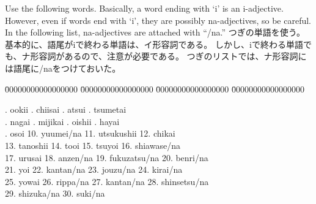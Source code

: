 \documentclass[uplatex,dvipdfmx,b5paper,english,10pt]{jsbook}
\begin{document}
\begin{toianswer}
\ifEnglish
Use the following words.
Basically, a word ending with `i' is an i-adjective.
However, even if words end with `i', they are possibly na-adjectives, so be careful.
In the following list, na-adjectives are attached with ``/na.''
\else
つぎの単語を使う。
基本的に、語尾がiで終わる単語は、イ形容詞である。
しかし、iで終わる単語でも、ナ形容詞があるので、注意が必要である。
つぎのリストでは、ナ形容詞には語尾に/naをつけておいた。
\fi

\begin{tabbing}
 \=
 00000000000000000 \=
 00000000000000000 \=
 00000000000000000 \=
 00000000000000000 \kill

 . ookii      . chiisai    . atsui      . tsumetai   \\

 . nagai      . mijikai    . oishii     . hayai      \\

 . osoi       \>
\hspace{-.5em}10. yuumei/na    \>
\hspace{-.5em}11. utsukushii   \>
\hspace{-.5em}12. chikai       \\

\>
\hspace{-.5em}13. tanoshii     \>
\hspace{-.5em}14. tooi         \>
\hspace{-.5em}15. tsuyoi       \>
\hspace{-.5em}16. shiawase/na  \\

\>
\hspace{-.5em}17. urusai       \>
\hspace{-.5em}18. anzen/na     \>
\hspace{-.5em}19. fukuzatsu/na \>
\hspace{-.5em}20. benri/na     \\

\>
\hspace{-.5em}21. yoi          \>
\hspace{-.5em}22. kantan/na    \>
\hspace{-.5em}23. jouzu/na     \>
\hspace{-.5em}24. kirai/na     \\

\>
\hspace{-.5em}25. yowai        \>
\hspace{-.5em}26. rippa/na     \>
\hspace{-.5em}27. kantan/na    \>
\hspace{-.5em}28. shinsetsu/na \\

\>
\hspace{-.5em}29. shizuka/na   \>
\hspace{-.5em}30. suki/na      \\

\end{tabbing}
\end{toianswer}
\end{document}

